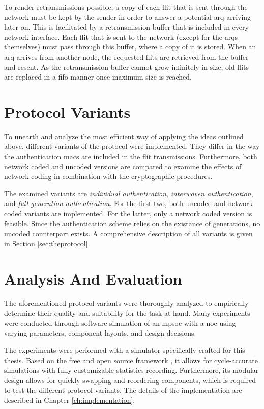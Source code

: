 To render retransmissions possible, a copy of each flit that is sent through the network must be kept by the sender in order to answer a potential
\gls{arq} arriving later on. This is facilitated by a retransmission buffer that is included in every network interface. Each flit that is sent to the
network (except for the \glspl{arq} themselves) must pass through this buffer, where a copy of it is stored. When an \gls{arq} arrives from another
node, the requested flits are retrieved from the buffer and resent. As the retransmission buffer cannot grow infinitely in size, old flits are
replaced in a \gls{fifo} manner once maximum size is reached.

\section{Protocol Variants}\label{sec:protocolvariants}
To unearth and analyze the most efficient way of applying the ideas outlined above, different variants of the protocol were implemented. They differ
in the way the authentication \glspl{mac} are included in the flit transmissions. Furthermore, both network coded and uncoded versions are compared to
examine the effects of network coding in combination with the cryptographic procedures.

The examined variants are \textit{individual authentication}, \textit{interwoven authentication}, and \textit{full-generation authentication}. For the
first two, both uncoded and network coded variants are implemented. For the latter, only a network coded version is feasible. Since the authentication
scheme relies on the existance of generations, no uncoded counterpart exists. A comprehensive description of all variants is given in Section
\ref{sec:theprotocol}. %

\section{Analysis And Evaluation}
The aforementioned protocol variants were thoroughly analyzed to empirically determine their quality and suitability for the task at hand. Many
experiments were conducted through software simulation of an \gls{mpsoc} with a \gls{noc} using varying parameters, component layouts, and design
decisions.

The experiments were performed with a simulator specifically crafted for this thesis. Based on the free and open source framework \omnet\cite{omnet}, it allows
for cycle-accurate simulations with fully customizable statistics recording. Furthermore, its modular design allows for quickly swapping and
reordering components, which is required to test the different protocol variants. The details of the implementation are described in Chapter
\ref{ch:implementation}.

